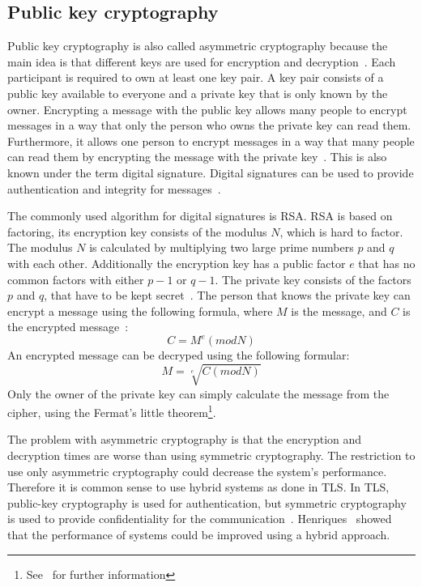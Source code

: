 \subsection{Public key cryptography}
Public key cryptography is also called asymmetric cryptography because the main idea is that different keys are used for encryption and decryption~\cite{anderson2020security}.
Each participant is required to own at least one key pair.
A key pair consists of a public key available to everyone and a private key that is only known by the owner.
Encrypting a message with the public key allows many people to encrypt messages in a way that only the person who owns the private key can read them.
Furthermore, it allows one person to encrypt messages in a way that many people can read them by encrypting the message with the private key~\cite{henriques2017using}.
This is also known under the term digital signature. 
Digital signatures can be used to provide authentication and integrity for messages~\cite{anderson2020security}.

The commonly used algorithm for digital signatures is RSA.
RSA is based on factoring, its encryption key consists of the modulus $N$, which is hard to factor.
The modulus $N$ is calculated by multiplying two large prime numbers $p$ and $q$ with each other.
Additionally the encryption key has a public factor $e$ that has no common factors with either $p-1$ or $q-1$.
The private key consists of the factors $p$ and $q$, that have to be kept secret~\cite{anderson2020security}.
The person that knows the private key can encrypt a message using the following formula, where $M$ is the message, and $C$ is the encrypted message~\cite{anderson2020security}:
\begin{displaymath}
	C = M^e (mod N)
\end{displaymath}
An encrypted message can be decryped using the following formular:
\begin{displaymath}
	M = \sqrt[e]{C (mod N)}
\end{displaymath}
Only the owner of the private key can simply calculate the message from the cipher, using the Fermat's little theorem\footnote{See~\cite{fermatlittle} for further information}.

The problem with asymmetric cryptography is that the encryption and decryption times are worse than using symmetric cryptography.
The restriction to use only asymmetric cryptography could decrease the system's performance.
Therefore it is common sense to use hybrid systems as done in TLS.
In TLS, public-key cryptography is used for authentication, but symmetric cryptography is used to provide confidentiality for the communication~\cite{henriques2017using}.
Henriques~\cite{henriques2017using} showed that the performance of systems could be improved using a hybrid approach.

